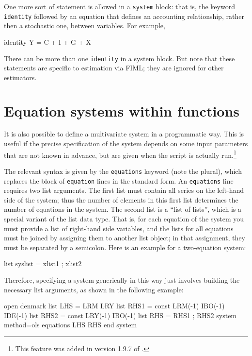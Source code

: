 One more sort of statement is allowed in a \texttt{system} block: that
is, the keyword \texttt{identity} followed by an equation that defines
an accounting relationship, rather then a stochastic one, between
variables. For example,

\begin{code}
  identity Y = C + I + G + X
\end{code}

There can be more than one \texttt{identity} in a system block. But
note that these statements are specific to estimation via FIML; they
are ignored for other estimators.

\section{Equation systems within functions}
\label{sec:system-functions}

It is also possible to define a multivariate system in a programmatic
way. This is useful if the precise specification of the system depends
on some input parameters that are not known in advance, but are given
when the script is actually run.\footnote{This feature was added in
  version 1.9.7 of .}

The relevant syntax is given by the \texttt{equations} keyword (note
the plural), which replaces the block of \texttt{equation} lines in
the standard form. An \texttt{equations} line requires two list
arguments. The first list must contain all series on the left-hand
side of the system; thus the number of elements in this first list
determines the number of equations in the system. The second list is a
``list of lists'', which is a special variant of the list data type.
That is, for each equation of the system you must provide a list of
right-hand side variables, and the lists for all equations must be
joined by assigning them to another list object; in that assignment,
they must be separated by a semicolon.  Here is an example for a
two-equation system:

\begin{code}
list syslist = xlist1 ; xlist2
\end{code}

Therefore, specifying a system generically in this way just involves 
building the necessary list arguments, as shown in the following
example:

\begin{code}
open denmark
list LHS = LRM LRY
list RHS1 = const LRM(-1) IBO(-1) IDE(-1)
list RHS2 = const LRY(-1) IBO(-1)
list RHS = RHS1 ; RHS2
system method=ols
     equations LHS RHS
end system
\end{code}


